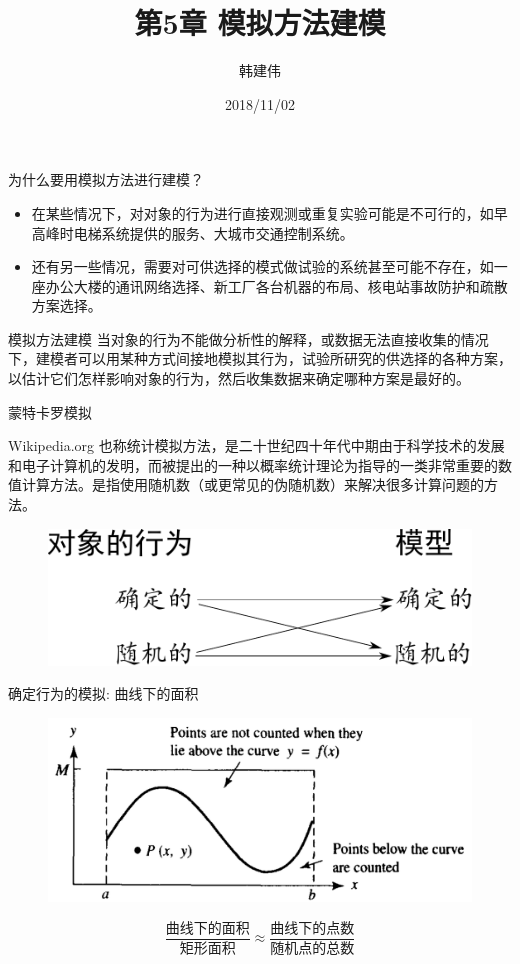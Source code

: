 \documentclass[UTF8]{ctexbeamer}
\title{第5章 模拟方法建模}
\author{韩建伟}
\institute{
  信息学院\\
  \texttt{hanjianwei@zjgsu.edu.cn}
}
\date{2018/11/02}
\begin{document}
\begin{frame}[plain]
  \titlepage{}
\end{frame}

\begin{frame}{为什么要用模拟方法进行建模？}

  \begin{itemize}
  \item 在某些情况下，对对象的行为进行直接观测或重复实验可能是不可行的，如早高峰时电梯系统提供的服务、大城市交通控制系统。
  \item 还有另一些情况，需要对可供选择的模式做试验的系统甚至可能不存在，如一座办公大楼的通讯网络选择、新工厂各台机器的布局、核电站事故防护和疏散方案选择。
  \end{itemize}

  \begin{block}{模拟方法建模}
    当对象的行为不能做分析性的解释，或数据无法直接收集的情况下，建模者可以用某种方式间接地模拟其行为，试验所研究的供选择的各种方案，以估计它们怎样影响对象的行为，然后收集数据来确定哪种方案是最好的。
  \end{block}
\end{frame}

\begin{frame}{蒙特卡罗模拟}
  \begin{block}{Wikipedia.org}
    也称统计模拟方法，是二十世纪四十年代中期由于科学技术的发展和电子计算机的发明，而被提出的一种以概率统计理论为指导的一类非常重要的数值计算方法。是指使用随机数（或更常见的伪随机数）来解决很多计算问题的方法。
  \end{block}

  \begin{figure}
    \centering
    \includegraphics[width=.7\textwidth{}]{action-model.pdf}
  \end{figure}
\end{frame}

\begin{frame}{确定行为的模拟: 曲线下的面积}
  \begin{figure}
    \centering
    \includegraphics[width=.7\textwidth{}]{curve.png}
  \end{figure}

  \[
  \frac{\text{曲线下的面积}}{\text{矩形面积}} \approx \frac{\text{曲线下的点数}}{\text{随机点的总数}}
  \]
  
\end{frame}
\end{document}
